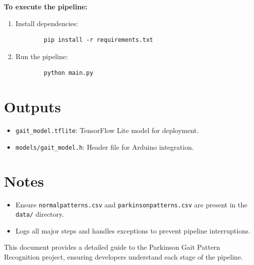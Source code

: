 \textbf{To execute the pipeline:}
\begin{enumerate}
	\item Install dependencies:
	\begin{verbatim}
		pip install -r requirements.txt
	\end{verbatim}
	
	\item Run the pipeline:
	\begin{verbatim}
		python main.py
	\end{verbatim}
\end{enumerate}

\section{Outputs}

\begin{itemize}
	\item \texttt{gait\_model.tflite}: TensorFlow Lite model for deployment.
	\item \texttt{models/gait\_model.h}: Header file for Arduino integration.
\end{itemize}

\section{Notes}

\begin{itemize}
	\item Ensure \texttt{normalpatterns.csv} and \texttt{parkinsonpatterns.csv} are present in the \texttt{data/} directory.
	\item Logs all major steps and handles exceptions to prevent pipeline interruptions.
\end{itemize}

This document provides a detailed guide to the Parkinson Gait Pattern Recognition project, ensuring developers understand each stage of the pipeline.

